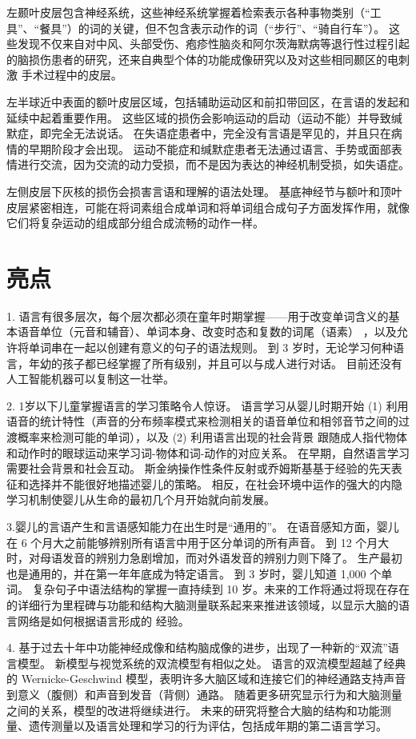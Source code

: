 左颞叶皮层包含神经系统，这些神经系统掌握着检索表示各种事物类别（“工具”、“餐具”）的词的关键，但不包含表示动作的词（“步行”、“骑自行车”）。 这些发现不仅来自对中风、头部受伤、疱疹性脑炎和阿尔茨海默病等退行性过程引起的脑损伤患者的研究，还来自典型个体的功能成像研究以及对这些相同颞区的电刺激 手术过程中的皮层。

左半球近中表面的额叶皮层区域，包括辅助运动区和前扣带回区，在言语的发起和延续中起着重要作用。 这些区域的损伤会影响运动的启动（运动不能）并导致缄默症，即完全无法说话。 在失语症患者中，完全没有言语是罕见的，并且只在病情的早期阶段才会出现。 运动不能症和缄默症患者无法通过语言、手势或面部表情进行交流，因为交流的动力受损，而不是因为表达的神经机制受损，如失语症。

左侧皮层下灰核的损伤会损害言语和理解的语法处理。 基底神经节与额叶和顶叶皮层紧密相连，可能在将词素组合成单词和将单词组合成句子方面发挥作用，就像它们将复杂运动的组成部分组合成流畅的动作一样。

\section{亮点}

1. 语言有很多层次，每个层次都必须在童年时期掌握——用于改变单词含义的基本语音单位（元音和辅音）、单词本身、改变时态和复数的词尾（语素） ，以及允许将单词串在一起以创建有意义的句子的语法规则。 到 3 岁时，无论学习何种语言，年幼的孩子都已经掌握了所有级别，并且可以与成人进行对话。 目前还没有人工智能机器可以复制这一壮举。 

2. 1岁以下儿童掌握语言的学习策略令人惊讶。 语言学习从婴儿时期开始 (1) 利用语音的统计特性（声音的分布频率模式来检测相关的语音单位和相邻音节之间的过渡概率来检测可能的单词），以及 (2) 利用语言出现的社会背景 跟随成人指代物体和动作时的眼球运动来学习词-物体和词-动作的对应关系。 在早期，自然语言学习需要社会背景和社会互动。 斯金纳操作性条件反射或乔姆斯基基于经验的先天表征和选择并不能很好地描述婴儿的策略。 相反，在社会环境中运作的强大的内隐学习机制使婴儿从生命的最初几个月开始就向前发展。 

3.婴儿的言语产生和言语感知能力在出生时是“通用的”。 在语音感知方面，婴儿在 6 个月大之前能够辨别所有语言中用于区分单词的所有声音。 到 12 个月大时，对母语发音的辨别力急剧增加，而对外语发音的辨别力则下降了。 生产最初也是通用的，并在第一年年底成为特定语言。 到 3 岁时，婴儿知道 1,000 个单词。 复杂句子中语法结构的掌握一直持续到 10 岁。未来的工作将通过将现在存在的详细行为里程碑与功能和结构大脑测量联系起来来推进该领域，以显示大脑的语言网络是如何根据语言形成的 经验。 

4. 基于过去十年中功能神经成像和结构脑成像的进步，出现了一种新的“双流”语言模型。 新模型与视觉系统的双流模型有相似之处。 语言的双流模型超越了经典的 Wernicke-Geschwind 模型，表明许多大脑区域和连接它们的神经通路支持声音到意义（腹侧）和声音到发音（背侧）通路。 随着更多研究显示行为和大脑测量之间的关系，模型的改进将继续进行。 未来的研究将整合大脑的结构和功能测量、遗传测量以及语言处理和学习的行为评估，包括成年期的第二语言学习。 

